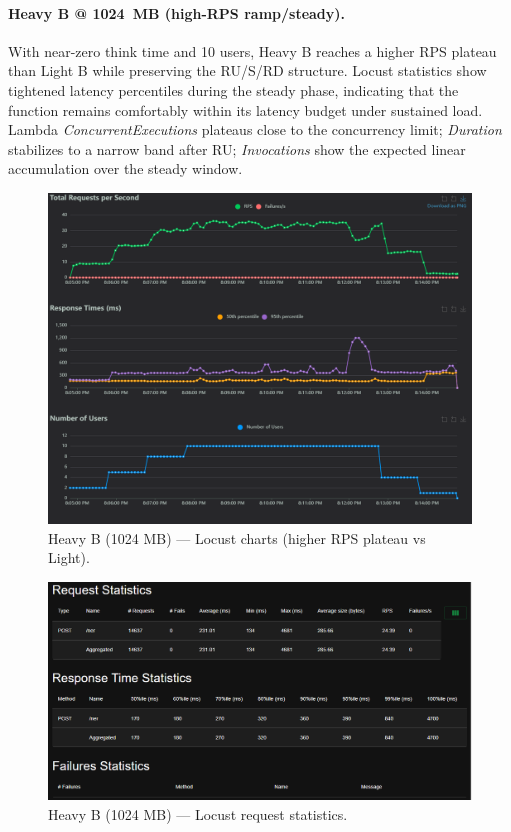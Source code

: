 \documentclass[11pt,a4paper]{article}
\begin{document}
\paragraph{Heavy B @ \SI{1024}{MB} (high-RPS ramp/steady).}
With near-zero think time and 10 users, Heavy B reaches a higher RPS plateau than Light B while preserving the RU/S/RD structure. Locust statistics show tightened latency percentiles during the steady phase, indicating that the function remains comfortably within its latency budget under sustained load. Lambda \emph{ConcurrentExecutions} plateaus close to the concurrency limit; \emph{Duration} stabilizes to a narrow band after RU; \emph{Invocations} show the expected linear accumulation over the steady window.

\begin{figure}[h!] \centering
  \includegraphics[width=\linewidth]{"figures/hB - Charts.png"}
  \caption{Heavy B (1024 MB) --- Locust charts (higher RPS plateau vs Light).}
\end{figure}

\begin{figure}[h!] \centering
  \includegraphics[width=\linewidth]{"figures/hB - Stats.png"}
  \caption{Heavy B (1024 MB) --- Locust request statistics.}
\end{figure}
\end{document}
